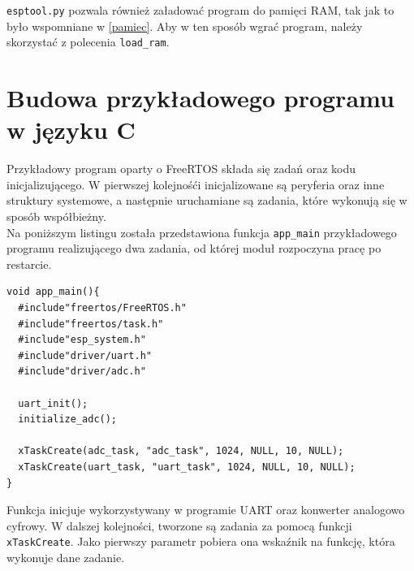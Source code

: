 \texttt{esptool.py} pozwala również załadować program do pamięci RAM, tak jak to było
wspomniane w \ref{pamiec}. Aby w ten sposób wgrać program, należy skorzystać z polecenia 
\texttt{load\_{}ram}.

\section{Budowa przykładowego programu w języku C}
\label{example_C}
Przykładowy program oparty o FreeRTOS składa się zadań oraz kodu 
inicjalizującego. W pierwszej kolejnośći inicjalizowane są peryferia oraz inne struktury
systemowe, a następnie uruchamiane są zadania, które wykonują się w sposób współbieżny. \\

Na poniższym listingu została przedstawiona funkcja \texttt{app\_{}main} przykładowego programu
realizującego dwa zadania, od której moduł rozpoczyna pracę po restarcie.\\

\begin{lstlisting}[style=customc,
    frame=single,
    caption={Przykładowa funkcja \texttt{app\_{}main}},
    captionpos=b,
    label={esptool_basic}]
void app_main(){
  #include"freertos/FreeRTOS.h"
  #include"freertos/task.h"
  #include"esp_system.h"
  #include"driver/uart.h"
  #include"driver/adc.h"

  uart_init();
  initialize_adc();
    
  xTaskCreate(adc_task, "adc_task", 1024, NULL, 10, NULL);
  xTaskCreate(uart_task, "uart_task", 1024, NULL, 10, NULL);
}
\end{lstlisting}

Funkcja inicjuje wykorzystywany w programie UART oraz konwerter analogowo cyfrowy.
W dalszej kolejności, tworzone są zadania za pomocą funkcji \texttt{xTaskCreate}.
Jako pierwszy parametr pobiera ona wskaźnik na funkcję, która wykonuje dane zadanie.